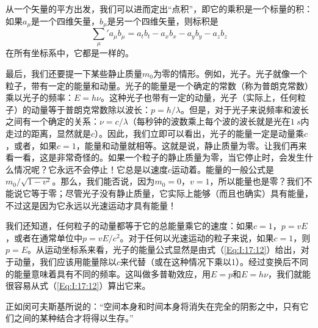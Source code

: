 从一个矢量的平方出发，我们可以进而定出“点积”，即它的乘积是一个标量的积：如果$a_\mu$是一个四维矢量，$b_\mu$是另一个四维矢量，则标积是
\begin{equation}
    \label{Eq:I:17:16}
    {\sum_{\mu}}' a_\mu b_\mu = a_tb_t - a_xb_x - a_yb_y - a_zb_z 
\end{equation}
在所有坐标系中，它都是一样的。

最后，我们还要提一下某些静止质量$m_0$为零的情形。例如，光子。光子就像一个粒子，带有一定的能量和动量。光子的能量是一个确定的常数（称为普朗克常数）乘以光子的频率：$E=h\nu$。这种光子也带有一定的动量，光子（实际上，任何粒子）的动量等于普朗克常数除以波长：$p=h/\lambda$。但是，对于光子来说频率和波长之间有一个确定的关系：$\nu=c/\lambda$（每秒钟的波数乘上每个波的波长就是光在$1~s$内走过的距离，显然就是$c$）。因此，我们立即可以看出，光子的能量一定是动量乘$c$，或者，如果$c=1$，能量和动量就相等。这就是说，静止质量为零。让我们再来看一看，这是非常奇怪的。如果一个粒子的静止质量为零，当它停止时，会发生什么情况呢？它永远不会停止！它总是以速度$c$运动着。能量的一般公式是$m_0/\sqrt{1-v^2}$。那么，我们能否说，因为$m_0=0$，$v=1$，所以能量也是零？我们不能说它等于零；尽管光子没有静止质量，它实际上能够（而且也确实）具有能量，不过这是因为它永远以光速运动才具有能量！

我们还知道，任何粒子的动量都等于它的总能量乘它的速度：如果$c=1$，$p=vE$，或者在通常单位中$p=vE/c^2$。对于任何以光速运动的粒子来说，如果$c=1$，则$p=E$。从运动坐标系来看，光子的能量公式显然是由式（\ref{Eq:I:17:12}）给出，对于动量，我们应该用能量除以$c$来代替（或在这种情况下乘以1）。经过变换后不同的能量意味着具有不同的频率。这叫做多普勒效应，用$E=p$和$E=h\nu$，我们就能很容易从式（\ref{Eq:I:17:12}）算出它来。

正如闵可夫斯基所说的：“空间本身和时间本身将消失在完全的阴影之中，只有它们之间的某种结合才将得以生存。”